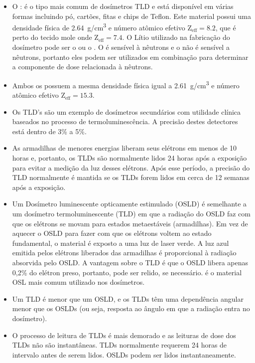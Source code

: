 \documentclass[11pt,a4paper]{article}
\newcounter{exemplo}
\begin{document}
\begin{exemplo}
\begin{itemize}
        \item O : é o tipo mais comum de dosímetros TLD e está disponível em várias formas incluindo pó, cartões, fitas e chips de Teflon. Este material possui uma densidade física de \qty{2.64}{g/cm^3} e número atômico efetivo $\mathrm{Z_{eff} = 8.2}$, que é perto do tecido mole onde $\mathrm{Z_{eff} = 7.4}$. O Lítio utilizado na fabricação do dosímetro pode ser o  ou o . O  é sensível à nêutrons e o  não é sensível a nêutrons, portanto eles podem ser utilizados em combinação para determinar a componente de dose relacionada à nêutrons. 
        
        \item Ambos os  possuem a mesma densidade física igual a \qty{2.61}{g/cm^3} e número atômico efetivo $\mathrm{Z_{eff} = 15.3}$.
        
        \item Os TLD's são um exemplo de dosímetros secundários com utilidade clínica baseados no processo de termoluminescência. A precisão destes detectores está dentro de 3\% a 5\%.
        
        \item As armadilhas de menores energias liberam seus elétrons em menos de 10 horas e, portanto, os TLDs são normalmente lidos 24 horas após a exposição para evitar a medição da luz desses elétrons. Após esse período, a precisão do TLD normalmente é mantida se os TLDs forem lidos em cerca de 12 semanas após a exposição.
        
        \item Um Dosímetro luminescente opticamente estimulado (OSLD) é semelhante a um dosímetro termoluminescente (TLD) em que a radiação do OSLD faz com que os elétrons se movam para estados metaestáveis (armadilhas). Em vez de aquecer o OSLD para fazer com que os elétrons voltem ao estado fundamental, o material é exposto a uma luz de laser verde. A luz azul emitida pelos elétrons liberados das armadilhas é proporcional à radiação absorvida pelo OSLD. A vantagem sobre o TLD é que o OSLD libera apenas 0,2\% do elétron preso, portanto, pode ser relido, se necessário.  é o material OSL mais comum utilizado nos dosímetros.
        
        \item Um TLD é menor que um OSLD, e os TLDs têm uma dependência angular menor que os OSLDs (ou seja, resposta ao ângulo em que a radiação entra no dosímetro).
        
        \item O processo de leitura de TLDs é mais demorado e as leituras de dose dos TLDs não são instantâneas. TLDs normalmente requerem 24 horas de intervalo antes de serem lidos. OSLDs podem ser lidos instantaneamente.
        

\end{itemize}
\end{exemplo}
\end{document}
